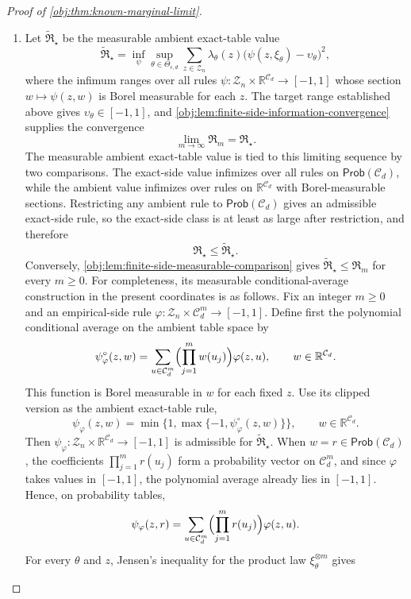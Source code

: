 \begin{proof}[Proof of \cref{obj:thm:known-marginal-limit}]
\begin{enumerate}
\item\label{pf:known-marginal-limit:ambient-exact} Let \(\widetilde{\mathfrak R}_\star\) be the measurable ambient exact-table value
\[
\widetilde{\mathfrak R}_\star
=
\inf_{\psi}
\sup_{\theta\in\Theta_{\epsilon,d}}
\sum_{z\in\mathcal Z_n}\lambda_\theta(z)
\bigl(\psi(z,\xi_\theta)-\upsilon_\theta\bigr)^2,
\]
where the infimum ranges over all rules
\(\psi:\mathcal Z_n\times\mathbb R^{\mathcal C_d}\to[-1,1]\) whose section
\(w\mapsto\psi(z,w)\) is Borel measurable for each \(z\).  The target range established above gives
\(\upsilon_\theta\in[-1,1]\), and \cref{obj:lem:finite-side-information-convergence} supplies the convergence
\[
\lim_{m\to\infty}\mathfrak R_m=\mathfrak R_\star .
\]
The measurable ambient exact-table value is tied to this limiting sequence by two comparisons.  The exact-side value infimizes over all rules on \(\mathsf{Prob}(\mathcal C_d)\), while the ambient value infimizes over rules on \(\mathbb R^{\mathcal C_d}\) with Borel-measurable sections.  Restricting any ambient rule to \(\mathsf{Prob}(\mathcal C_d)\) gives an admissible exact-side rule, so the exact-side class is at least as large after restriction, and therefore
\[
\mathfrak R_\star\le \widetilde{\mathfrak R}_\star .
\]
Conversely, \cref{obj:lem:finite-side-measurable-comparison} gives
\(\widetilde{\mathfrak R}_\star\le\mathfrak R_m\) for every \(m\ge0\).
For completeness, its measurable conditional-average construction in the
present coordinates is as follows.  Fix an integer \(m\ge0\) and an empirical-side rule
\(\varphi:\mathcal Z_n\times\mathcal C_d^m\to[-1,1]\).  Define first the polynomial conditional average on the ambient table space by
\[
\psi_\varphi^\circ(z,w)
=
\sum_{u\in\mathcal C_d^m}
\Bigl(\prod_{j=1}^m w(u_j)\Bigr)\varphi(z,u),
\qquad
w\in\mathbb R^{\mathcal C_d}.
\]
This function is Borel measurable in \(w\) for each fixed \(z\).  Use its clipped version as the ambient exact-table rule,
\[
\psi_\varphi(z,w)
=
\min\{1,\max\{-1,\psi_\varphi^\circ(z,w)\}\},
\qquad
w\in\mathbb R^{\mathcal C_d}.
\]
Then \(\psi_\varphi:\mathcal Z_n\times\mathbb R^{\mathcal C_d}\to[-1,1]\) is admissible for \(\widetilde{\mathfrak R}_\star\).  When \(w=r\in\mathsf{Prob}(\mathcal C_d)\), the coefficients \(\prod_{j=1}^m r(u_j)\) form a probability vector on \(\mathcal C_d^m\), and since \(\varphi\) takes values in \([-1,1]\), the polynomial average already lies in \([-1,1]\).  Hence, on probability tables,
\[
\psi_\varphi(z,r)
=
\sum_{u\in\mathcal C_d^m}
\Bigl(\prod_{j=1}^m r(u_j)\Bigr)\varphi(z,u).
\]
For every \(\theta\) and \(z\), Jensen's inequality for the product law \(\xi_\theta^{\otimes m}\) gives

\end{enumerate}
\end{proof}
